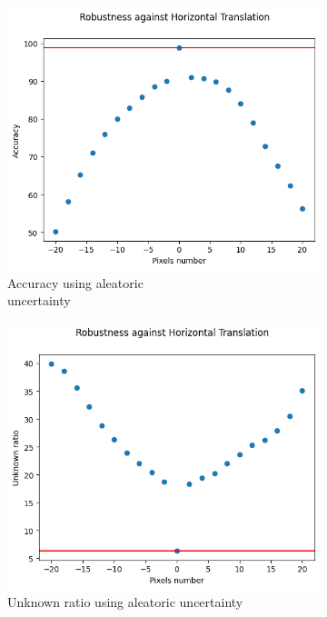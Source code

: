 \begin{figure}[h]
	\centering
	\begin{subfigure}{.33\textwidth}
		\centering
		\includegraphics[width=0.9\linewidth]{ImageFiles/EvalBNN/HT/AU/acc}
		\caption{Accuracy using aleatoric \\ uncertainty}
		\label{fig:ht_au_acc}
	\end{subfigure}%
	\begin{subfigure}{.33\textwidth}
		\centering
		\includegraphics[width=0.9\linewidth]{ImageFiles/EvalBNN/HT/AU/unkn}
		\caption{Unknown ratio using aleatoric uncertainty}
		\label{fig:ht_au_unkn}
	\end{subfigure}%
	\begin{subfigure}{.33\textwidth}

\end{subfigure}
\end{figure}
